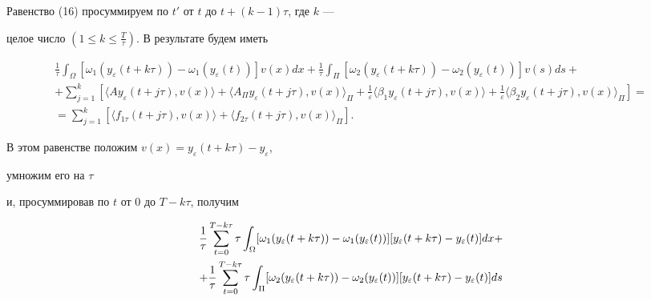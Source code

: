 \begin{pf} 


Равенство (16) просуммируем по $t'$ от $t$ до $t+(k-1)\tau$, где $k$ --- 


целое число $(1\le k\le \frac{T}{\tau})$. В результате будем иметь 


\begin{gather*} 


\frac{1}{\tau}\int_\Omega [\omega_1(y_\varepsilon(t+k\tau))- 


\omega_1(y_\varepsilon(t))]v(x)dx + 


\frac{1}{\tau}\int_\Pi [\omega_2(y_\varepsilon(t+k\tau))- 


\omega_2(y_\varepsilon(t))]v(s)ds +\\ 


+\sum^k_{j=1}[\langle Ay_\varepsilon(t+j\tau),v(x)\rangle + 


\langle A_\Pi y_\varepsilon(t+j\tau),v(x)\rangle_\Pi + 


\frac{1}{\varepsilon}\langle \beta_1y_\varepsilon(t+j\tau),v(x)\rangle 


+\frac{1}{\varepsilon}\langle \beta_2y_\varepsilon(t+j\tau),v(x) 


\rangle_\Pi] =\\ 


=\sum_{j=1}^k[\langle f_{1\tau}(t+j\tau),v(x)\rangle +  


\langle f_{2\tau}(t+j\tau),v(x)\rangle_\Pi]. 


\end{gather*} 


В этом равенстве положим $v(x)=y_\varepsilon(t+k\tau)-y_\varepsilon$, 


умножим его на $\tau$ 


и, просуммировав по $t$ от 0 до $T-k\tau$, получим 


\begin{gather} 


\frac{1}{\tau} 


\sum^{T-k\tau}_{t=0}\tau\int_{\Omega}[\omega_1(y_\varepsilon(t+k\tau))- 


\omega_1(y_\varepsilon(t))][y_\varepsilon(t+k\tau)-y_\varepsilon(t)]dx 


+\notag\\ 


+\frac{1}{\tau}


\sum^{T-k\tau}_{t=0}\tau\int_{\Pi}[\omega_2(y_\varepsilon(t+k\tau))- 


\omega_2(y_\varepsilon(t))][y_\varepsilon(t+k\tau)-y_\varepsilon(t)]ds 



\end{gather}
\end{pf}
